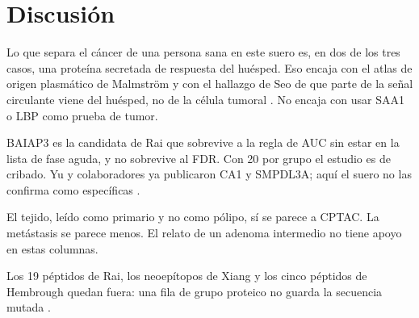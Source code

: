 \documentclass[11pt]{article}
\begin{document}
\section{Discusión}
Lo que separa el cáncer de una persona sana en este suero es, en dos de los tres casos, una proteína secretada de respuesta del huésped. Eso encaja con el atlas de origen plasmático de Malmström y con el hallazgo de Seo de que parte de la señal circulante viene del huésped, no de la célula tumoral \cite{malmstrom2025,seo2026}. No encaja con usar SAA1 o LBP como prueba de tumor.

BAIAP3 es la candidata de Rai que sobrevive a la regla de AUC sin estar en la lista de fase aguda, y no sobrevive al FDR. Con 20 por grupo el estudio es de cribado. Yu y colaboradores ya publicaron CA1 y SMPDL3A; aquí el suero no las confirma como específicas \cite{yu2026}.

El tejido, leído como primario y no como pólipo, sí se parece a CPTAC. La metástasis se parece menos. El relato de un adenoma intermedio no tiene apoyo en estas columnas.

Los 19 péptidos de Rai, los neoepítopos de Xiang y los cinco péptidos de Hembrough quedan fuera: una fila de grupo proteico no guarda la secuencia mutada \cite{xiang2026,hembrough2026}.
\end{document}
